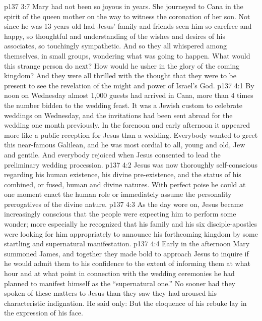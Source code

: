 \vs p137 3:7 Mary had not been so joyous in years. She journeyed to Cana in the spirit of the queen mother on the way to witness the coronation of her son. Not since he was 13 years old had Jesus’ family and friends seen him so carefree and happy, so thoughtful and understanding of the wishes and desires of his associates, so touchingly sympathetic. And so they all whispered among themselves, in small groups, wondering what was going to happen. What would this strange person do next? How would he usher in the glory of the coming kingdom? And they were all thrilled with the thought that they were to be present to see the revelation of the might and power of Israel’s God.
\vs p137 4:1 By noon on Wednesday almost 1,000 guests had arrived in Cana, more than 4 times the number bidden to the wedding feast. It was a Jewish custom to celebrate weddings on Wednesday, and the invitations had been sent abroad for the wedding one month previously. In the forenoon and early afternoon it appeared more like a public reception for Jesus than a wedding. Everybody wanted to greet this near\hyp{}famous Galilean, and he was most cordial to all, young and old, Jew and gentile. And everybody rejoiced when Jesus consented to lead the preliminary wedding procession.
\vs p137 4:2 Jesus was now thoroughly self\hyp{}conscious regarding his human existence, his divine pre\hyp{}existence, and the status of his combined, or fused, human and divine natures. With perfect poise he could at one moment enact the human role or immediately assume the personality prerogatives of the divine nature.
\vs p137 4:3 As the day wore on, Jesus became increasingly conscious that the people were expecting him to perform some wonder; more especially he recognized that his family and his six disciple\hyp{}apostles were looking for him appropriately to announce his forthcoming kingdom by some startling and supernatural manifestation.
\vs p137 4:4 Early in the afternoon Mary summoned James, and together they made bold to approach Jesus to inquire if he would admit them to his confidence to the extent of informing them at what hour and at what point in connection with the wedding ceremonies he had planned to manifest himself as the “supernatural one.” No sooner had they spoken of these matters to Jesus than they saw they had aroused his characteristic indignation. He said only:  But the eloquence of his rebuke lay in the expression of his face.
